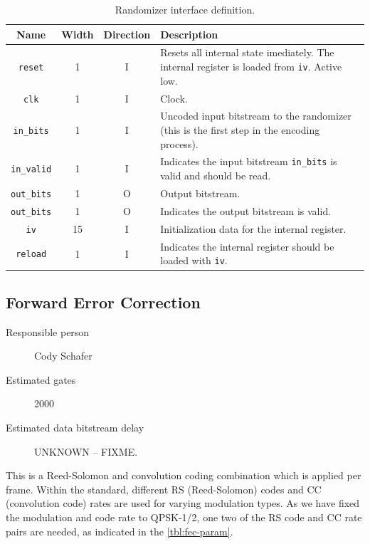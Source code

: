 \documentclass[dvips,10pt,twocolumn]{article}
\newcommand{\wire}{\texttt}
\begin{document}
\begin{table} \begin{tabularx}{\textwidth}{c|c|c|X}
	\label{tbl:rand-io}
	Name & Width & Direction & Description \\ \hline
	
	\wire{reset}     & 1  & I & Resets all internal state
	imediately. The internal register is loaded from
	\wire{iv}. Active low. \\

	\wire{clk}       & 1  & I & Clock. \\

	\wire{in\_bits}  & 1  & I & Uncoded input bitstream to the
	randomizer (this is the first step in the encoding process).\\

	\wire{in\_valid} & 1  & I & Indicates the input bitstream
	\wire{in\_bits} is valid and should be read. \\

	\wire{out\_bits} & 1  & O & Output bitstream. \\
	
	\wire{out\_bits} & 1  & O & Indicates the output bitstream
	is valid. \\

	\wire{iv}        & 15 & I & Initialization data for the
	internal register. \\

	\wire{reload}    & 1  & I & Indicates the internal
	register should be loaded with \wire{iv}. \\

\end{tabularx}
\caption{Randomizer interface definition.}
\end{table}
	

\subsection{Forward Error Correction}
\label{sec:fec}
\begin{description}
	\item[Responsible person] Cody Schafer 
	\item[Estimated gates] 2000
	\item[Estimated data bitstream delay] UNKNOWN -- FIXME.
\end{description}

This is a Reed-Solomon and convolution coding combination
which is applied per frame. Within the standard, different
RS (Reed-Solomon) codes and CC (convolution code) rates are
used for varying modulation types. As we have fixed the
modulation and code rate to QPSK-1/2, one two of the RS
code and CC rate pairs are needed, as indicated in the
\autoref{tbl:fec-param}.
\end{document}
